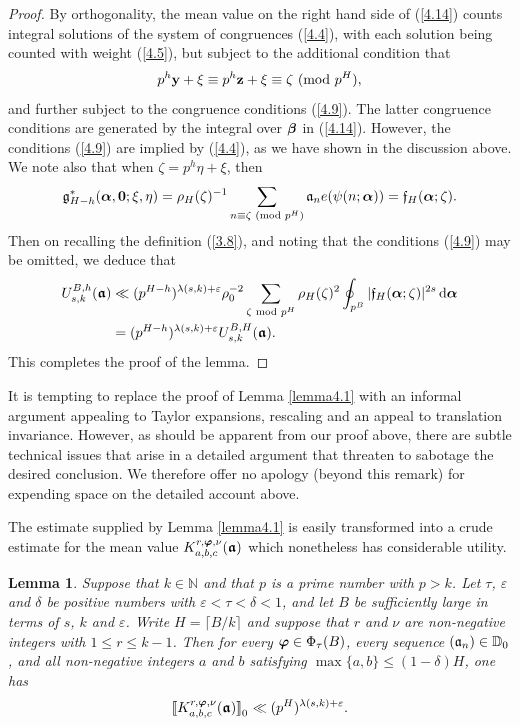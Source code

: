 \documentclass[12pt,reqno]{amsart}
\newtheorem{lemma}[theorem]{Lemma}
\theoremstyle{definition}
\theoremstyle{remark}
\numberwithin{equation}{section}
\newcommand{\mmod}[1]{\,\,(\text{\rm mod}\,\,#1)}
\newcommand{\nmod}[1]{\,\,\text{\rm mod}\,\,#1}
\def\bfy{{\mathbf y}}
\def\bfz{{\mathbf z}}
\def\dbN{{\mathbb N}} \def\dbO{{\mathbb O}} \def\dbP{{\mathbb P}}
\def\gra{{\mathfrak a}}\def\grA{{\mathfrak A}}\def\bfgra{{\boldsymbol \gra}}
\def\grf{{\mathfrak f}}\def\grF{{\mathfrak F}}
\def\grg{{\mathfrak g}}\def\grG{{\mathfrak G}}
\def\del{{\delta}} \def\Del{{\Delta}} \def\Deltil{{\widetilde \Delta}}
\def\zet{{\zeta}} \def\bfzet{{\boldsymbol \zeta}} \def\zetbar{{\overline \zet}}
\def\lam{{\lambda}} \def\Lam{{\Lambda}} \def\Lamtil{{\widetilde \Lambda}}
\def\eps{\varepsilon}
\def\le{\leqslant} \def\ge{\geqslant} \def\pleq{\preccurlyeq} \def\ple{\prec}
\def\d{{\,{\rm d}}}
\newcommand{\rrbracketsub}[1]{\rrbracket_{\textstyle{_#1}}}
\begin{document}
\begin{proof}
\par By orthogonality, the mean value on the right hand side of (\ref{4.14}) counts integral 
solutions of the system of congruences (\ref{4.4}), with each solution being counted with 
weight (\ref{4.5}), but subject to the additional condition that
$$p^h\bfy+\xi\equiv p^h\bfz+\xi\equiv \zet \mmod{p^H},$$
and further subject to the congruence conditions (\ref{4.9}). The latter congruence 
conditions are generated by the integral over ${\boldsymbol \beta}$ in (\ref{4.14}). However, the 
conditions (\ref{4.9}) are implied by (\ref{4.4}), as we have shown in the discussion above. 
We note also that when $\zet=p^h\eta+\xi$, then
$$\grg_{H-h}^*(\bfalp,{\mathbf 0};\xi,\eta)=\rho_H(\zet)^{-1}
\sum_{n\equiv \zet \mmod{p^H}}\gra_ne(\psi(n;\bfalp))=\grf_H(\bfalp;\zet).$$
Then on recalling the definition (\ref{3.8}), and noting that the conditions (\ref{4.9}) may be 
omitted, we deduce that
\begin{align*}
U_{s,k}^{B,h}(\bfgra)&\ll (p^{H-h})^{\lam(s,k)+\eps}\rho_0^{-2}\sum_{\zet\nmod{p^H}}
\rho_H(\zet)^2\oint_{p^B}|\grf_H(\bfalp;\zet)|^{2s}\d\bfalp \\
&=(p^{H-h})^{\lam(s,k)+\eps}U_{s,k}^{B,H}(\bfgra).
\end{align*}
This completes the proof of the lemma.
\end{proof}

It is tempting to replace the proof of Lemma \ref{lemma4.1} with an informal argument 
appealing to Taylor expansions, rescaling and an appeal to translation invariance. However, 
as should be apparent from our proof above, there are subtle technical issues that arise in 
a detailed argument that threaten to sabotage the desired conclusion. We therefore offer 
no apology (beyond this remark) for expending space on the detailed account above.\par

The estimate supplied by Lemma \ref{lemma4.1} is easily transformed into a crude 
estimate for the mean value $K_{a,b,c}^{r,\bfvarphi,\nu}(\bfgra)$ which nonetheless 
has considerable utility.

\begin{lemma}\label{lemma4.2} Suppose that $k\in \dbN$ and that $p$ is a prime number 
with $p>k$. Let $\tau$, $\eps$ and $\del$ be positive numbers with $\eps<\tau<\del<1$, 
and let $B$ be sufficiently large in terms of $s$, $k$ and $\eps$. Write $H=\lceil B/k\rceil$ 
and suppose that $r$ and $\nu$ are non-negative integers with $1\le r\le k-1$. Then for 
every ${\boldsymbol \varphi}\in \Phi_\tau(B)$, every sequence $(\gra_n)\in \dbD_0$, and all 
non-negative integers $a$ and $b$ satisfying $\max\{a,b\}\le (1-\del)H$, one has
$$\llbracket K_{a,b,c}^{r,\bfvarphi,\nu}(\bfgra)\rrbracketsub{0}\ll (p^H)^{\lam(s,k)+\eps}.
$$
\end{lemma} 
\end{document}

